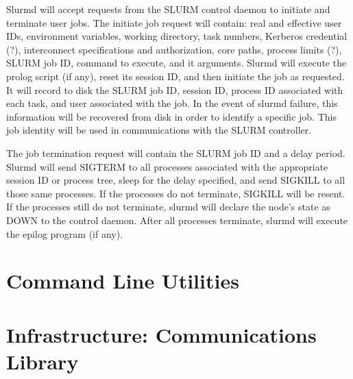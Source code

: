 Slurmd will accept requests from the SLURM control daemon 
to initiate and terminate user jobs. The initiate 
job request will contain: real and effective user IDs, 
environment variables, working directory, task numbers, 
Kerberos credential (?), interconnect specifications 
and authorization, core paths, process limits (?), SLURM job ID,
command to execute, and it arguments. Slurmd will 
execute the prolog script (if any), reset its session
ID, and then initiate the job as requested. It will 
record to disk the SLURM job ID, session ID, process ID associated 
with each task, and user associated with the job. 
In the event of slurmd failure, this information will 
be recovered from disk in order to identify a specific 
job. This  job identity will be used in communications 
with the SLURM controller.


The job termination request will contain the SLURM job ID and 
a delay period. Slurmd will send SIGTERM to all processes associated 
with the appropriate session ID or process tree, sleep for the 
delay specified, and send SIGKILL to all those same processes. 
If the processes do not terminate, SIGKILL will be resent. 
If the processes still do not terminate, slurmd will declare 
the node's state as DOWN to the control daemon. After all 
processes terminate, slurmd will execute the epilog program 
(if any). 

\section{Command Line Utilities}

\section{Infrastructure: Communications Library}

